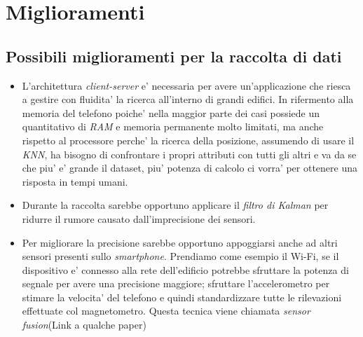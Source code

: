 \chapter{Miglioramenti}
\section{Possibili miglioramenti per la raccolta di dati}
\begin{itemize}
	\item L'architettura \textit{client-server} e' necessaria per avere un'applicazione che riesca a gestire con fluidita' la ricerca all'interno di grandi edifici. In rifermento alla memoria del telefono poiche' nella maggior parte dei casi possiede un quantitativo di \textit{RAM} e memoria permanente molto limitati, ma anche rispetto al processore perche' la ricerca della posizione, assumendo di usare il \textit{KNN}, ha bisogno di confrontare i propri attributi con tutti gli altri e va da se che piu' e' grande il dataset, piu' potenza di calcolo ci vorra' per ottenere una risposta in tempi umani.
	\item Durante la raccolta sarebbe opportuno applicare il \textit{filtro di Kalman} per ridurre il rumore causato dall'imprecisione dei sensori.
	\item Per migliorare la precisione sarebbe opportuno appoggiarsi anche ad altri sensori presenti sullo \textit{smartphone}. Prendiamo come esempio il Wi-Fi, se il dispositivo e' connesso alla rete dell'edificio potrebbe sfruttare la potenza di segnale per avere una precisione maggiore; sfruttare l'accelerometro per stimare la velocita' del telefono e quindi standardizzare tutte le rilevazioni effettuate col magnetometro. Questa tecnica viene chiamata \textit{sensor fusion}(Link a qualche paper)
\end{itemize}